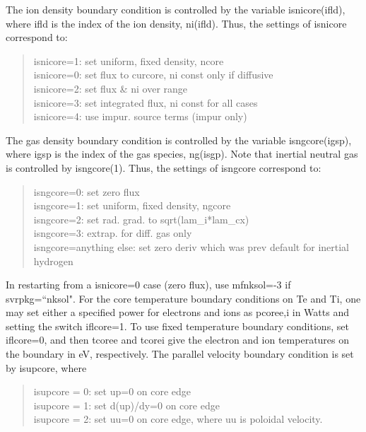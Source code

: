 \documentclass [12pt]{article}
\begin{document}
The ion density boundary condition is controlled by the variable 
isnicore(ifld), where ifld is the index of the ion density, ni(ifld). Thus,
the settings of {\sf isnicore} correspond to:
\begin{verse} \sf
            isnicore=1:   set uniform, fixed density, ncore\\
            isnicore=0:   set flux to curcore, ni const only if diffusive\\
            isnicore=2:   set flux \& ni over range\\
            isnicore=3:   set integrated flux, ni const for all cases\\
            isnicore=4:   use impur. source terms (impur only)\\
\end{verse}
The gas density boundary condition is controlled by the variable
isngcore(igsp), where igsp is the index of the gas species, ng(isgp).  Note
that inertial neutral gas is controlled by isngcore(1). Thus, the settings
of {\sf isngcore} correspond to:
\begin{verse} \sf
            isngcore=0:   set zero flux\\
            isngcore=1:   set uniform, fixed density, ngcore\\
            isngcore=2:   set rad. grad. to sqrt(lam\_i*lam\_cx)\\
            isngcore=3:   extrap. for diff. gas only\\
            isngcore=anything else:   set zero deriv which was prev default for
                             inertial hydrogen
\end{verse}

In restarting from a isnicore=0 case (zero flux), use mfnksol=-3 if
svrpkg=``nksol".
   For the core temperature boundary conditions on Te and Ti, one may set
either a specified power for electrons and ions as pcoree,i in Watts and
setting the switch iflcore=1.  To use fixed temperature boundary conditions,
set iflcore=0, and then tcoree and tcorei give the electron and ion
temperatures on the boundary in eV, respectively.
   The parallel velocity boundary condition is set by {\sf isupcore}, where
\begin{verse} \sf
      isupcore = 0:    set up=0 on core edge\\
      isupcore = 1:    set d(up)/dy=0 on core edge\\
      isupcore = 2:    set uu=0 on core edge, where uu is poloidal velocity.
\end{verse}
\end{document}
